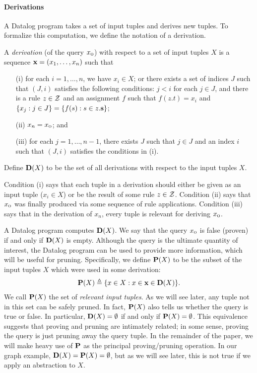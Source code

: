 \paragraph{Derivations}

A Datalog program takes a set of input tuples and derives new
tuples.  To formalize this computation, we define the notation of a derivation.

A {\em derivation} (of the query $x_\text{\sc o}$) with respect to a set of input tuples
$X$ is a sequence $\mathbf{x} = (x_1, \dots, x_n)$ such that
\begin{enumerate}
\item [(i)] for each $i = 1, \dots, n$, we have $x_i \in X$; or
there exists a set of indices $J$ such that $(J,i)$ satisfies the following conditions:
$j < i$ for each $j \in J$, and
there is a rule $z \in \mathcal{Z}$ and an assignment $f$
such that $f(z.t) = x_i$ and
$\{ x_j : j \in J \} = \{ f(s) : s \in z.\mathbf{s} \}$;
\item [(ii)] $x_n = x_\text{\sc o}$; and
\item [(iii)] 
for each $j = 1, \dots, n\!-\!1$,
there exists $J$ such that $j \in J$ and an index $i$
such that $(J,i)$ satisfies the conditions in (i).
\end{enumerate}
Define $\mathbf{D}(X)$ to be the set of all derivations with respect to the input tuples $X$.

Condition (i) says that each tuple in a derivation
should either be given as an input tuple ($x_i \in X$)
or be the result of some rule $z \in \mathcal{Z}$.
Condition (ii) says that $x_\text{\sc o}$ was finally produced via some sequence of rule applications.
Condition (iii) says that in the derivation of $x_n$, every tuple is relevant for deriving $x_\text{\sc o}$.

A Datalog program computes $\mathbf{D}(X)$.
We say that the query $x_\text{\sc o}$ is false (proven) if and only if $\mathbf{D}(X)$ is empty.
Although the query is the ultimate quantity of interest,
the Datalog program can be used to provide more information, which will be useful for pruning.
Specifically, we define $\mathbf{P}(X)$ to be the subset of the input tuples $X$
which were used in some derivation:
\begin{align}
\label{eqn:Pdef}
\mathbf{P}(X) \triangleq \{ x \in X : x \in \mathbf{x} \in \mathbf{D}(X) \}.
\end{align}
We call $\mathbf{P}(X)$ the set of {\em relevant input tuples}.  As we will see later,
any tuple not in this set can be safely pruned.
In fact, $\mathbf{P}(X)$ also tells us whether the query is true or false.
In particular, $\mathbf{D}(X) = \emptyset$ if and only if $\mathbf{P}(X) = \emptyset$.
This equivalence suggests that proving and pruning are intimately related;
in some sense, proving the query is just pruning away the query tuple.
In the remainder of the paper, we will make heavy use of $\mathbf{P}$ as the principal
proving/pruning operation.
In our graph example, $\mathbf{D}(X) = \mathbf{P}(X) = \emptyset$,
but as we will see later, this is not true if we apply an abstraction to $X$.

